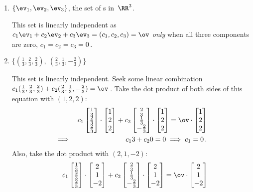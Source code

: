\begin{example}
\begin{enumerate}[ref=\ref{eg:lindep}(\alph*)]
\item {}\(\{\ev_1,\ev_2,\ev_3\}\), the set of s in~\(\RR^3\).
\begin{solution} 
This set is linearly independent as
\(c_1\ev_1+c_2\ev_2+c_3\ev_3=(c_1,c_2,c_3)=\ov\)
\emph{only} when all three components are zero, \(c_1=c_2=c_3=0\)\,. 
\end{solution}

\item \(\{(\frac13,\frac23,\frac23),\ (\frac23,\frac13,-\frac23)\}\)
\begin{solution} 
This set is linearly independent.
Seek some linear combination \(c_1(\frac13,\frac23,\frac23) +c_2(\frac23,\frac13,-\frac23) =\ov\)\,.
Take the dot product of both sides of this equation with \((1,2,2)\):
\begin{eqnarray*}
&&c_1\begin{bmatrix}\frac13\\\frac23\\\frac23 \end{bmatrix}\cdot\begin{bmatrix} 1\\2\\2 \end{bmatrix} +c_2\begin{bmatrix} \frac23\\\frac13\\-\frac23 \end{bmatrix}\cdot\begin{bmatrix} 1\\2\\2 \end{bmatrix} =\ov\cdot\begin{bmatrix} 1\\2\\2 \end{bmatrix}
\\\implies&& c_13+c_20=0
\implies c_1=0\,.
\end{eqnarray*}
Also, take the dot product with \((2,1,-2)\): 
\begin{eqnarray*}
&&c_1\begin{bmatrix}\frac13\\\frac23\\\frac23 \end{bmatrix}\cdot\begin{bmatrix} 2\\1\\-2 \end{bmatrix} +c_2\begin{bmatrix} \frac23\\\frac13\\-\frac23 \end{bmatrix}\cdot\begin{bmatrix} 2\\1\\-2 \end{bmatrix} =\ov\cdot\begin{bmatrix} 2\\1\\-2 \end{bmatrix}

\end{eqnarray*}
\end{solution}
\end{enumerate}
\end{example}
